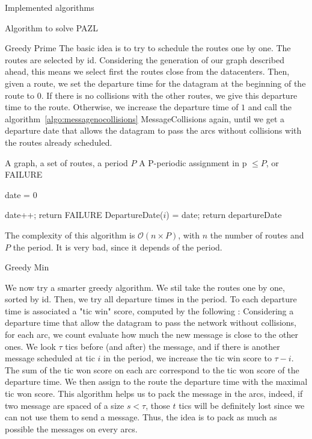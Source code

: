 \documentclass[10pt]{article}
\begin{document}
\begin{section}{Implemented algorithms}
  \begin{subsection}{Algorithm to solve PAZL }

  

   
  \begin{subsubsection}{Greedy Prime}
  The basic idea is to try to schedule the routes one by one. The routes are selected by id. Considering the generation of our graph described ahead, this means we select first the routes close from the datacenters.  Then, given a route, we set the departure time for the datagram at the beginning of the route to $0$. If there is no collisions with the other routes, we give this departure time to the route. Otherwise, we increase the departure time of $1$ and call the algorithm~\ref{algo:messagenocollisions} MessageCollisions again, until we get a departure date that allows the datagram to pass the arcs without collisions with the routes already scheduled.

   	\begin{algorithm}[H]
 	\caption{Greedy Prime}
	\label{algo:greedyprime}
 	\begin{algorithmic}
 	\REQUIRE A graph, a set of routes, a period $P$
	\ENSURE A P-periodic assignment in p $\leq P$, or FAILURE

	\STATE date = $0$
	
 	
 	\STATE date++;
	\STATE return FAILURE
	\ENDIF
 	\ENDWHILE
	\STATE DepartureDate($i$) = date;
 	\ENDFOR
	\STATE return departureDate
 	\end{algorithmic}
 	\end{algorithm}
 	The complexity of this algorithm is $\mathcal{O}(n\times P)$, with $n$ the number of routes and $P$ the period. It is very bad, since it depends of the period.
  \end{subsubsection}
    \begin{subsubsection}{Greedy Min}
  
  We now try a smarter greedy algorithm. We stil take the routes one by one, sorted by id. Then, we try all departure times in the period. To each departure time is associated a "tic win" score, computed by the following : Considering a departure time that allow the datagram to pass the network without collisions, for each arc, we count evaluate how much the new message is close to the other ones. We look $\tau$ tics before (and after) the message, and if there is another message scheduled at tic $i$ in the period, we increase the tic win score to $\tau -i$.
  The sum of the tic won score on each arc correspond to the tic won score of the departure time. We then assign to the route the departure time with the maximal tic won score.
  This algorithm helps us to pack the message in the arcs, indeed, if two message are spaced of a size $s < \tau$, those $t$ tics will be definitely lost since we can not use them to send a message. Thus, the idea is to pack as much as possible the messages on every arcs.
  

\end{subsubsection}
\end{subsection}
\end{section}
\end{document}
